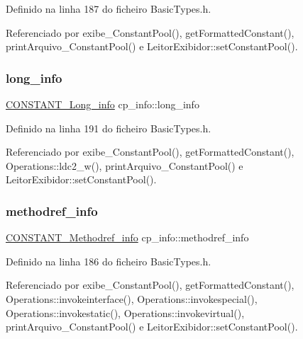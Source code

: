 Definido na linha 187 do ficheiro Basic\+Types.\+h.



Referenciado por exibe\+\_\+\+Constant\+Pool(), get\+Formatted\+Constant(), print\+Arquivo\+\_\+\+Constant\+Pool() e Leitor\+Exibidor\+::set\+Constant\+Pool().

\mbox{\label{structcp__info_ab0a2bfb802609dbdb4985cb55f465e6f}} 
\subsubsection{\texorpdfstring{long\+\_\+info}{long\_info}}
{\footnotesize\ttfamily \hyperlink{structCONSTANT__Long__info}{C\+O\+N\+S\+T\+A\+N\+T\+\_\+\+Long\+\_\+info} cp\+\_\+info\+::long\+\_\+info}



Definido na linha 191 do ficheiro Basic\+Types.\+h.



Referenciado por exibe\+\_\+\+Constant\+Pool(), get\+Formatted\+Constant(), Operations\+::ldc2\+\_\+w(), print\+Arquivo\+\_\+\+Constant\+Pool() e Leitor\+Exibidor\+::set\+Constant\+Pool().

\mbox{\label{structcp__info_ab1304804bef6a0fe6575671223d7d689}} 
\subsubsection{\texorpdfstring{methodref\+\_\+info}{methodref\_info}}
{\footnotesize\ttfamily \hyperlink{structCONSTANT__Methodref__info}{C\+O\+N\+S\+T\+A\+N\+T\+\_\+\+Methodref\+\_\+info} cp\+\_\+info\+::methodref\+\_\+info}



Definido na linha 186 do ficheiro Basic\+Types.\+h.



Referenciado por exibe\+\_\+\+Constant\+Pool(), get\+Formatted\+Constant(), Operations\+::invokeinterface(), Operations\+::invokespecial(), Operations\+::invokestatic(), Operations\+::invokevirtual(), print\+Arquivo\+\_\+\+Constant\+Pool() e Leitor\+Exibidor\+::set\+Constant\+Pool().

